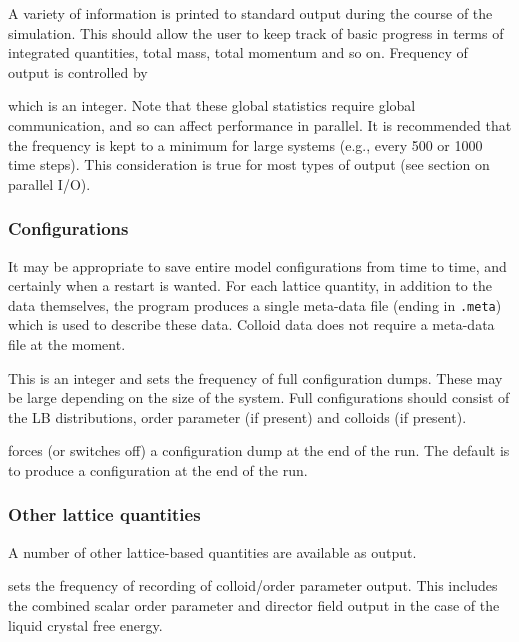 A variety of information is printed to standard output during the
course of the simulation. This should allow the user to keep track
of basic progress in terms of integrated quantities, total mass,
total momentum and so on. Frequency of output is controlled by


which is an integer. Note that these global statistics require
global communication, and so can affect performance in parallel.
It is recommended that the frequency is kept to a minimum for
large systems (e.g., every 500 or 1000 time steps). This
consideration is true for most types of output (see section
on parallel I/O).

\subsubsection{Configurations}

It may be appropriate to save entire model configurations from
time to time, and certainly when a restart is wanted. For each lattice
quantity, in addition to the data themselves, the program produces a
single meta-data file (ending in
\texttt{.meta}) which is used to describe these data. Colloid
data does not require a meta-data file at the moment.


This is an integer and sets the frequency of full configuration dumps.
These may be large depending on the size of the system.
Full configurations should consist of the LB distributions,
order parameter (if present) and colloids (if present).



forces (or switches off) a configuration dump at the end of the run.
The default is to produce a configuration at the end of the run.

\subsubsection{Other lattice quantities}

A number of other lattice-based quantities are available as output.


sets the frequency of recording of colloid/order parameter output.
This includes the combined scalar order parameter and director
field output in the case of the liquid crystal free energy.

